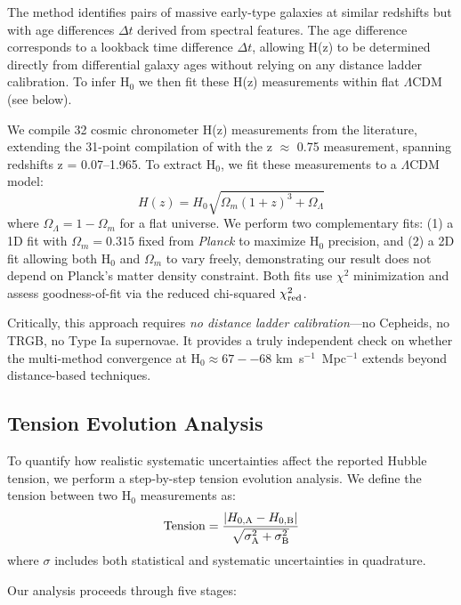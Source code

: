 \documentclass[preprint, linenumbers]{aastex701}
\begin{document}
The method identifies pairs of massive early-type galaxies at similar redshifts but with age differences $\Delta t$ derived from spectral features. The age difference corresponds to a lookback time difference $\Delta t$, allowing H(z) to be determined directly from differential galaxy ages without relying on any distance ladder calibration. To infer H$_0$ we then fit these H(z) measurements within flat $\Lambda$CDM (see below).

We compile 32 cosmic chronometer H(z) measurements from the literature, extending the 31-point compilation of \citet{Moresco2022} with the \citet{Borghi2022} z $\approx$ 0.75 measurement, spanning redshifts z = 0.07--1.965. To extract H$_0$, we fit these measurements to a $\Lambda$CDM model:
\begin{equation}
H(z) = H_0 \sqrt{\Omega_m (1+z)^3 + \Omega_\Lambda}
\end{equation}
where $\Omega_\Lambda = 1 - \Omega_m$ for a flat universe. We perform two complementary fits: (1) a 1D fit with $\Omega_m = 0.315$ fixed from \textit{Planck} \citep{Planck2018} to maximize H$_0$ precision, and (2) a 2D fit allowing both H$_0$ and $\Omega_m$ to vary freely, demonstrating our result does not depend on Planck's matter density constraint. Both fits use $\chi^2$ minimization and assess goodness-of-fit via the reduced chi-squared $\chi^2_{\rm red}$.

Critically, this approach requires \textit{no distance ladder calibration}---no Cepheids, no TRGB, no Type Ia supernovae. It provides a truly independent check on whether the multi-method convergence at H$_0 \approx 67--68$ km~s$^{-1}$~Mpc$^{-1}$ extends beyond distance-based techniques.

\subsection{Tension Evolution Analysis} \label{sec:methods_tension}

To quantify how realistic systematic uncertainties affect the reported Hubble tension, we perform a step-by-step tension evolution analysis. We define the tension between two H$_0$ measurements as:
\begin{equation}
{\rm Tension} = \frac{|H_{0,\rm A} - H_{0,\rm B}|}{\sqrt{\sigma_{\rm A}^2 + \sigma_{\rm B}^2}}
\end{equation}
where $\sigma$ includes both statistical and systematic uncertainties in quadrature.

Our analysis proceeds through five stages:
\end{document}
